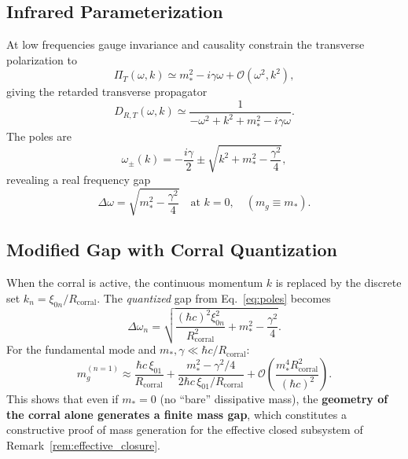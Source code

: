 \documentclass[aps,prd,reprint,superscriptaddress,floatfix]{revtex4-2}
\theoremstyle{definition}
\newcommand{\bigO}{\mathcal{O}}
\newcommand{\corr}{_{\mathrm{corral}}}
\begin{document}
\subsection{Infrared Parameterization}

At low frequencies gauge invariance and causality constrain the transverse
polarization to
\begin{equation}
  \Pi_T(\omega,k)\simeq m_*^2 - i\gamma\omega + \bigO(\omega^2,k^2),
  \label{eq:PI_T}
\end{equation}
giving the retarded transverse propagator
\begin{equation}
  D_{R,T}(\omega,k)\simeq
  \frac{1}{-\omega^2+k^2+m_*^2-i\gamma\omega}.
  \label{eq:prop}
\end{equation}
The poles are
\begin{equation}
  \omega_\pm(k) = -\frac{i\gamma}{2}
  \pm\sqrt{k^2+m_*^2-\frac{\gamma^2}{4}},
  \label{eq:poles}
\end{equation}
revealing a real frequency gap
\begin{equation}
  \Delta\omega = \sqrt{m_*^2-\frac{\gamma^2}{4}}
  \quad\text{at }k=0,\quad (m_g\equiv m_*).
\end{equation}

\subsection{Modified Gap with Corral Quantization}

When the corral is active, the continuous momentum $k$ is replaced by the
discrete set $k_n=\xi_{0n}/R\corr$. The \emph{quantized} gap from
Eq.~\eqref{eq:poles} becomes
\begin{equation}
  \Delta\omega_n =
  \sqrt{\frac{(\hbar c)^2\xi_{0n}^2}{R\corr^2}+m_*^2-\frac{\gamma^2}{4}}.
  \label{eq:quantized_gap}
\end{equation}
For the fundamental mode and $m_*,\gamma\ll\hbar c/R\corr$:
\begin{equation}
  m_g^{(n=1)} \approx \frac{\hbar c\,\xi_{01}}{R\corr}
  + \frac{m_*^2 - \gamma^2/4}{2\hbar c\,\xi_{01}/R\corr}
  + \bigO\!\left(\frac{m_*^4 R\corr^2}{(\hbar c)^2}\right).
  \label{eq:gap_expansion}
\end{equation}
This shows that even if $m_*=0$ (no ``bare'' dissipative mass), the
\textbf{geometry of the corral alone generates a finite mass gap}, which
constitutes a constructive proof of mass generation for the effective
closed subsystem of Remark~\ref{rem:effective_closure}.
\end{document}
